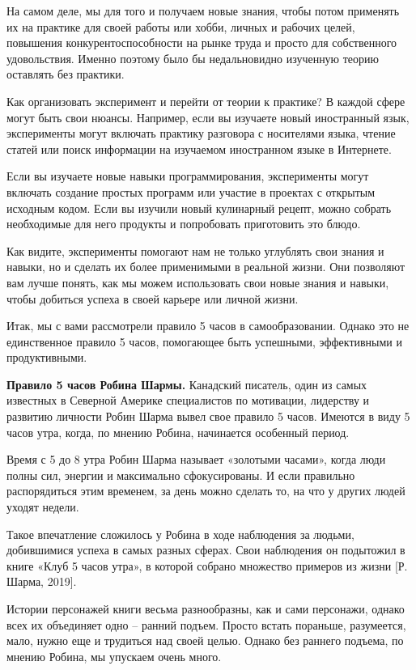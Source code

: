 На самом деле, мы для того и получаем новые знания, чтобы потом применять их на практике для своей работы или хобби, личных и рабочих целей, повышения конкурентоспособности на рынке труда и просто для собственного удовольствия. Именно поэтому было бы недальновидно изученную теорию оставлять без практики.

Как организовать эксперимент и перейти от теории к практике? В каждой сфере могут быть свои нюансы. Например, если вы изучаете новый иностранный язык, эксперименты могут включать практику разговора с носителями языка, чтение статей или поиск информации на изучаемом иностранном языке в Интернете.

Если вы изучаете новые навыки программирования, эксперименты могут включать создание простых программ или участие в проектах с открытым исходным кодом. Если вы изучили новый кулинарный рецепт, можно собрать необходимые для него продукты и попробовать приготовить это блюдо.

Как видите, эксперименты помогают нам не только углублять свои знания и навыки, но и сделать их более применимыми в реальной жизни. Они позволяют вам лучше понять, как мы можем использовать свои новые знания и навыки, чтобы добиться успеха в своей карьере или личной жизни.

Итак, мы с вами рассмотрели правило 5 часов в самообразовании. Однако это не единственное правило 5 часов, помогающее быть успешными, эффективными и продуктивными.

\textbf{Правило 5 часов Робина Шармы.}
Канадский писатель, один из самых известных в Северной Америке специалистов по мотивации, лидерству и развитию личности Робин Шарма вывел свое правило 5 часов. Имеются в виду 5 часов утра, когда, по мнению Робина, начинается особенный период.

Время с 5 до 8 утра Робин Шарма называет «золотыми часами», когда люди полны сил, энергии и максимально сфокусированы. И если правильно распорядиться этим временем, за день можно сделать то, на что у других людей уходят недели.

Такое впечатление сложилось у Робина в ходе наблюдения за людьми, добившимися успеха в самых разных сферах. Свои наблюдения он подытожил в книге «Клуб 5 часов утра», в которой собрано множество примеров из жизни [Р. Шарма, 2019].

Истории персонажей книги весьма разнообразны, как и сами персонажи, однако всех их объединяет одно – ранний подъем. Просто встать пораньше, разумеется, мало, нужно еще и трудиться над своей целью. Однако без раннего подъема, по мнению Робина, мы упускаем очень много.

